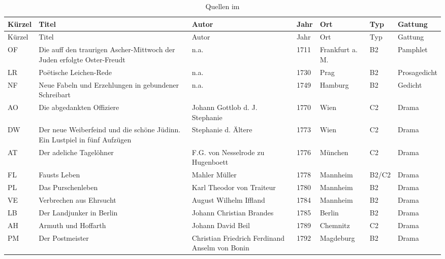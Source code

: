 \setcounter{chapter}{1}

\footnotesize
 \begin{longtable}{l>{\raggedright}p{2cm}>{\raggedright}p{2cm}lllp{2cm}}
	\caption{Quellen im  }\label{appendixchrliji1}
\\
\lsptoprule
 Kürzel & Titel & Autor & Jahr & Ort & Typ & Gattung \\ 
\midrule\endfirsthead
Kürzel & Titel & Autor & Jahr & Ort & Typ & Gattung \\ \midrule\endhead
\lspbottomrule\endlastfoot
OF & Die auff den traurigen Ascher-Mittwoch der Juden erfolgte Oster-Freudt  & n.a. & 1711 & Frankfurt a. \,M.& B2 & Pamphlet \\ 
LR & Poëtische Leichen-Rede  & n.a. & 1730 & Prag & B2 & Prosa\-gedicht \\ 
NF & Neue Fabeln und Erzehlungen in gebundener Schreibart  & n.a. & 1749 & Hamburg & B2 & Gedicht \\ 
AO  & Die abgedankten Offiziere & Johann Gottlob d. J. Stephanie & 1770 & Wien & C2 & Drama \\ 
DW  & Der neue Weiberfeind und die schöne Jüdinn. Ein Lustpiel in fünf Aufzügen & Stephanie d. Ältere & 1773 & Wien & C2 & Drama \\ 
AT  & Der adeliche Tagelöhner & F.G. von Nesselrode zu Hugenboett & 1776 & München & C2 & Drama \\ 
FL  & Fausts Leben  & Mahler Müller & 1778 & Mannheim & B2\slash C2 & Drama \\ 
PL  & Das Purschenleben  & Karl Theodor von Traiteur & 1780 & Mannheim & B2 & Drama \\ 
VE & Verbrechen aus Ehrsucht & August Wilhelm Iffland & 1784 & Mannheim & B2 & Drama \\ 
LB & Der Landjunker in Berlin  & Johann Christian Brandes & 1785 & Berlin & B2 & Drama \\ 
AH  & Armuth und Hoffarth  & Johann David Beil & 1789 & Chemnitz & C2 & Drama \\ 
PM  & Der Postmeister  & Christian Friedrich Ferdinand Anselm von Bonin & 1792 & Magdeburg & B2 & Drama \\ 

\end{longtable}
